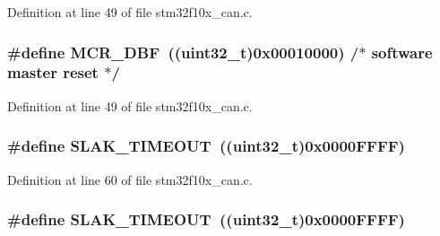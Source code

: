 Definition at line 49 of file stm32f10x\+\_\+can.\+c.

\subsubsection[{\texorpdfstring{M\+C\+R\+\_\+\+D\+BF}{MCR_DBF}}]{\setlength{\rightskip}{0pt plus 5cm}\#define M\+C\+R\+\_\+\+D\+BF~(({\bf uint32\+\_\+t})0x00010000) /$\ast$ software master reset $\ast$/}\hypertarget{group___c_a_n___private___defines_ga1ded3736beb63c49281f2983fc68c36d}{}\label{group___c_a_n___private___defines_ga1ded3736beb63c49281f2983fc68c36d}


Definition at line 49 of file stm32f10x\+\_\+can.\+c.

\subsubsection[{\texorpdfstring{S\+L\+A\+K\+\_\+\+T\+I\+M\+E\+O\+UT}{SLAK_TIMEOUT}}]{\setlength{\rightskip}{0pt plus 5cm}\#define S\+L\+A\+K\+\_\+\+T\+I\+M\+E\+O\+UT~(({\bf uint32\+\_\+t})0x0000\+F\+F\+F\+F)}\hypertarget{group___c_a_n___private___defines_ga1bb8107706c8b4039ac55a122f3c65bb}{}\label{group___c_a_n___private___defines_ga1bb8107706c8b4039ac55a122f3c65bb}


Definition at line 60 of file stm32f10x\+\_\+can.\+c.

\subsubsection[{\texorpdfstring{S\+L\+A\+K\+\_\+\+T\+I\+M\+E\+O\+UT}{SLAK_TIMEOUT}}]{\setlength{\rightskip}{0pt plus 5cm}\#define S\+L\+A\+K\+\_\+\+T\+I\+M\+E\+O\+UT~(({\bf uint32\+\_\+t})0x0000\+F\+F\+F\+F)}\hypertarget{group___c_a_n___private___defines_ga1bb8107706c8b4039ac55a122f3c65bb}{}\label{group___c_a_n___private___defines_ga1bb8107706c8b4039ac55a122f3c65bb}


